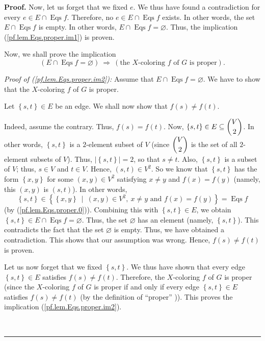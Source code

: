 \documentclass[numbers=enddot,12pt,final,onecolumn,notitlepage]{scrartcl}%
\theoremstyle{definition}
\newenvironment{proof}[1][Proof]{\noindent\textbf{#1.} }{\ \rule{0.5em}{0.5em}}
\newenvironment{verlong}{}{}
\begin{document}
\begin{verlong}
\begin{proof}
Now, let us forget that we fixed $e$. We thus have found a contradiction for
every $e\in E\cap\operatorname*{Eqs}f$. Therefore, no $e\in E\cap
\operatorname*{Eqs}f$ exists. In other words, the set $E\cap
\operatorname*{Eqs}f$ is empty. In other words, $E\cap\operatorname*{Eqs}%
f=\varnothing$. Thus, the implication (\ref{pf.lem.Eqs.proper.im1}) is proven.

Now, we shall prove the implication%
\begin{equation}
\left(  E\cap\operatorname*{Eqs}f=\varnothing\right)  \ \Longrightarrow
\ \left(  \text{the }X\text{-coloring }f\text{ of }G\text{ is proper}\right)
. \label{pf.lem.Eqs.proper.im2}%
\end{equation}


\textit{Proof of (\ref{pf.lem.Eqs.proper.im2}):} Assume that $E\cap
\operatorname*{Eqs}f=\varnothing$. We have to show that the $X$-coloring $f$
of $G$ is proper.

Let $\left\{  s,t\right\}  \in E$ be an edge. We shall now show that $f\left(
s\right)  \neq f\left(  t\right)  $.

Indeed, assume the contrary. Thus, $f\left(  s\right)  =f\left(  t\right)  $.
Now, $\left\{  s,t\right\}  \in E\subseteq\dbinom{V}{2}$. In other words,
$\left\{  s,t\right\}  $ is a $2$-element subset of $V$ (since $\dbinom{V}{2}$
is the set of all $2$-element subsets of $V$). Thus, $\left\vert \left\{
s,t\right\}  \right\vert =2$, so that $s\neq t$. Also, $\left\{  s,t\right\}
$ is a subset of $V$; thus, $s\in V$ and $t\in V$. Hence, $\left(  s,t\right)
\in V^{2}$. So we know that $\left\{  s,t\right\}  $ has the form $\left\{
x,y\right\}  $ for some $\left(  x,y\right)  \in V^{2}$ satisfying $x\neq y$
and $f\left(  x\right)  =f\left(  y\right)  $ (namely, this $\left(
x,y\right)  $ is $\left(  s,t\right)  $). In other words,%
\[
\left\{  s,t\right\}  \in\left\{  \left\{  x,y\right\}  \ \mid\ \left(
x,y\right)  \in V^{2},\ x\neq y\text{ and }f\left(  x\right)  =f\left(
y\right)  \right\}  =\operatorname*{Eqs}f
\]
(by (\ref{pf.lem.Eqs.proper.0})). Combining this with $\left\{  s,t\right\}
\in E$, we obtain $\left\{  s,t\right\}  \in E\cap\operatorname*{Eqs}%
f=\varnothing$. Thus, the set $\varnothing$ has an element (namely, $\left\{
s,t\right\}  $). This contradicts the fact that the set $\varnothing$ is
empty. Thus, we have obtained a contradiction. This shows that our assumption
was wrong. Hence, $f\left(  s\right)  \neq f\left(  t\right)  $ is proven.

Let us now forget that we fixed $\left\{  s,t\right\}  $. We thus have shown
that every edge $\left\{  s,t\right\}  \in E$ satisfies $f\left(  s\right)
\neq f\left(  t\right)  $. Therefore, the $X$-coloring $f$ of $G$ is proper
(since the $X$-coloring $f$ of $G$ is proper if and only if every edge
$\left\{  s,t\right\}  \in E$ satisfies $f\left(  s\right)  \neq f\left(
t\right)  $ (by the definition of \textquotedblleft proper\textquotedblright%
)). This proves the implication (\ref{pf.lem.Eqs.proper.im2}).


\end{proof}
\end{verlong}
\end{document}
